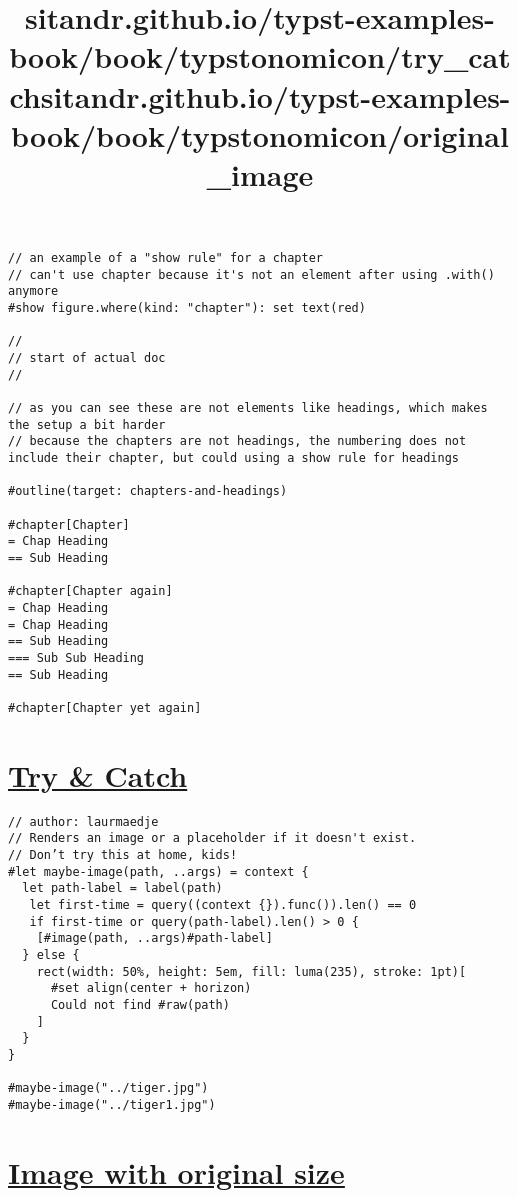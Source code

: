 \begin{verbatim}
// an example of a "show rule" for a chapter
// can't use chapter because it's not an element after using .with() anymore
#show figure.where(kind: "chapter"): set text(red)

//
// start of actual doc
//

// as you can see these are not elements like headings, which makes the setup a bit harder
// because the chapters are not headings, the numbering does not include their chapter, but could using a show rule for headings

#outline(target: chapters-and-headings)

#chapter[Chapter]
= Chap Heading
== Sub Heading

#chapter[Chapter again]
= Chap Heading
= Chap Heading
== Sub Heading
=== Sub Sub Heading
== Sub Heading

#chapter[Chapter yet again]
\end{verbatim}

\pandocbounded{}


\title{sitandr.github.io/typst-examples-book/book/typstonomicon/try_catch}

\section{\texorpdfstring{\hyperref[try--catch]{Try \&
Catch}}{Try \& Catch}}\label{try--catch}

\begin{verbatim}
// author: laurmaedje
// Renders an image or a placeholder if it doesn't exist.
// Don’t try this at home, kids!
#let maybe-image(path, ..args) = context {
  let path-label = label(path)
   let first-time = query((context {}).func()).len() == 0
   if first-time or query(path-label).len() > 0 {
    [#image(path, ..args)#path-label]
  } else {
    rect(width: 50%, height: 5em, fill: luma(235), stroke: 1pt)[
      #set align(center + horizon)
      Could not find #raw(path)
    ]
  }
}

#maybe-image("../tiger.jpg")
#maybe-image("../tiger1.jpg")
\end{verbatim}

\pandocbounded{}


\title{sitandr.github.io/typst-examples-book/book/typstonomicon/original_image}

\section{\texorpdfstring{\hyperref[image-with-original-size]{Image with
original
size}}{Image with original size}}\label{image-with-original-size}

